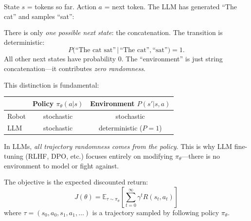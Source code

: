 \begin{example}
    State $s$ = tokens so far. Action $a$ = next token. The LLM has generated ``The cat'' and samples ``sat'':
    \begin{center}
    \end{center}
    There is only \emph{one possible next state}: the concatenation. The transition is deterministic:
    \[
        P\bigl(\text{``The cat sat''} \,\big|\, \text{``The cat''}, \text{``sat''}\bigr) = 1.
    \]
    All other next states have probability 0. The ``environment'' is just string concatenation---it contributes \emph{zero randomness}.
\end{example}

\begin{remark}
    This distinction is fundamental:
    \begin{center}
        \begin{tabular}{l|cc}
                  & \textbf{Policy} $\pi_\theta(a|s)$ & \textbf{Environment} $P(s'|s,a)$ \\
            \hline
            Robot & stochastic                        & stochastic                       \\
            LLM   & stochastic                        & deterministic ($P=1$)
        \end{tabular}
    \end{center}
    In LLMs, \emph{all trajectory randomness comes from the policy}. This is why LLM fine-tuning (RLHF, DPO, etc.) focuses entirely on modifying $\pi_\theta$---there is no environment to model or fight against.
\end{remark}

\begin{definition}[RL Objective]
    The objective is the expected discounted return:
    \[
        J(\theta) = \mathbb{E}_{\tau \sim \pi_\theta} \left[ \sum_{t=0}^{\infty} \gamma^t R(s_t, a_t) \right]
    \]
    where $\tau = (s_0, a_0, s_1, a_1, \ldots)$ is a trajectory sampled by following policy $\pi_\theta$.
\end{definition}

